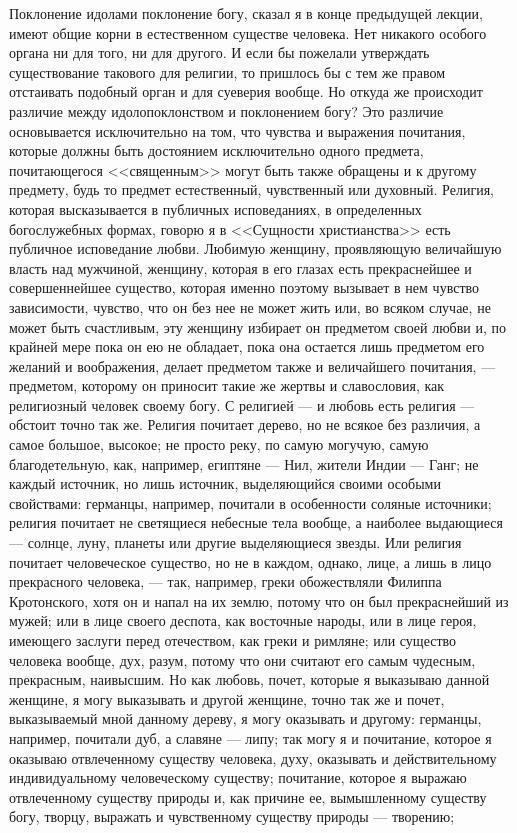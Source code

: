 \documentclass[12pt]{article}
\begin{document}
Поклонение идолами поклонение богу, сказал я в конце предыдущей лекции, имеют общие корни в естественном существе человека. Нет никакого особого органа ни для того, ни для другого. И если бы пожелали утверждать существование такового для религии, то пришлось бы с тем же правом отстаивать подобный орган и для суеверия вообще. Но откуда же происходит различие между идолопоклонством и поклонением богу? Это различие основывается исключительно на том, что чувства и выражения почитания, которые должны быть достоянием исключительно одного предмета, почитающегося <<священным>>  могут быть также обращены и к другому предмету, будь то предмет естественный, чувственный или духовный. Религия, которая высказывается в публичных исповеданиях, в определенных богослужебных формах, говорю я в <<Сущности христианства>>  есть публичное исповедание любви. Любимую женщину, проявляющую величайшую власть над мужчиной, женщину, которая в его глазах есть прекраснейшее и совершеннейшее существо, которая именно поэтому вызывает в нем чувство зависимости, чувство, что он без нее не может жить или, во всяком случае, не может быть счастливым, эту женщину избирает он предметом своей любви и, по крайней мере пока он ею не обладает, пока она остается лишь предметом его желаний и воображения, делает предметом также и величайшего почитания, --- предметом, которому он приносит такие же жертвы и славословия, как религиозный человек своему богу. С религией --- и любовь есть религия --- обстоит точно так же. Религия почитает дерево, но не всякое без различия, а самое большое, высокое; не просто реку, по самую могучую, самую благодетельную, как, например, египтяне --- Нил, жители Индии --- Ганг; не каждый источник, но лишь источник, выделяющийся своими особыми свойствами: германцы, например, почитали в особенности соляные источники; религия почитает не светящиеся небесные тела вообще, а наиболее выдающиеся --- солнце, луну, планеты или другие выделяющиеся звезды. Или религия почитает человеческое существо, но не в каждом, однако, лице, а лишь в лицо прекрасного человека, --- так, например, греки обожествляли Филиппа Кротонского, хотя он и напал на их землю, потому что он был прекраснейший из мужей; или в лице своего деспота, как восточные народы, или в лице героя, имеющего заслуги перед отечеством, как греки и римляне; или существо человека вообще, дух, разум, потому что они считают его самым чудесным, прекрасным, наивысшим. Но как любовь, почет, которые я выказываю данной женщине, я могу выказывать и другой женщине, точно так же и почет, выказываемый мной данному дереву, я могу оказывать и другому: германцы, например, почитали дуб, а славяне --- липу; так могу я и почитание, которое я оказываю отвлеченному существу человека, духу, оказывать и действительному индивидуальному человеческому существу; почитание, которое я выражаю отвлеченному существу природы и, как причине ее, вымышленному существу богу, творцу, выражать и чувственному существу природы --- творению; 
\end{document}
